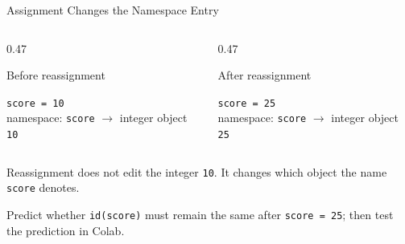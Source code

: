 \documentclass[aspectratio=169,10pt]{beamer}
\begin{document}
\begin{frame}{Assignment Changes the Namespace Entry}

  \begin{columns}[T,onlytextwidth]

    \begin{column}{0.47\textwidth}

      \begin{block}{Before reassignment}

        \texttt{score = 10}\\[0.08in]
        namespace: \texttt{score} $\longrightarrow$ integer object \texttt{10}

      \end{block}

    \end{column}

    \begin{column}{0.47\textwidth}

      \begin{block}{After reassignment}

        \texttt{score = 25}\\[0.08in]
        namespace: \texttt{score} $\longrightarrow$ integer object \texttt{25}

      \end{block}

    \end{column}

  \end{columns}

  \vspace{0.10in}

  \begin{keyidea}

    Reassignment does not edit the integer \texttt{10}. It changes which object the name \texttt{score} denotes.

  \end{keyidea}

  \begin{activity}

    Predict whether \texttt{id(score)} must remain the same after \texttt{score = 25}; then test the prediction in Colab.

  \end{activity}

\end{frame}
\end{document}
